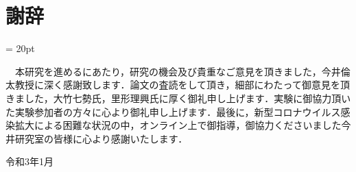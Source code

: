 %
%
\chapter*{謝辞}
\baselineskip = 20pt

\begin{verbatimtab}
　本研究を進めるにあたり，研究の機会及び貴重なご意見を頂きました，今井倫太教授に深く感謝致します．論文の査読をして頂き，細部にわたって御意見を頂きました，大竹七勢氏，里形理興氏に厚く御礼申し上げます．実験に御協力頂いた実験参加者の方々に心より御礼申し上げます．最後に，新型コロナウイルス感染拡大による困難な状況の中，オンライン上で御指導，御協力くださいました今井研究室の皆様に心より感謝いたします．


							令和3年1月
\end{verbatimtab}
